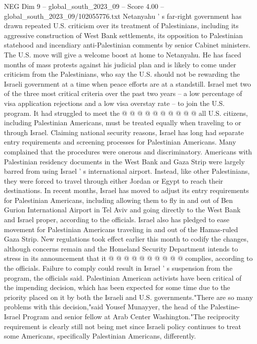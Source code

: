 \begin{textsample}{NEG Dim 9 – global\_south\_2023\_09 – Score 4.00 – global\_south\_2023\_09/102055776.txt}
Netanyahu ' s far-right government has drawn repeated U.S. criticism over its treatment of Palestinians, including its aggressive construction of West Bank settlements, its opposition to Palestinian statehood and incendiary anti-Palestinian comments by senior Cabinet ministers.
The U.S. move will give a welcome boost at home to Netanyahu.
He has faced months of mass protests against his judicial plan and is likely to come under criticism from the Palestinians, who say the U.S. should not be rewarding the Israeli government at a time when peace efforts are at a standstill.
Israel met two of the three most critical criteria over the past two years -- a low percentage of visa application rejections and a low visa overstay rate -- to join the U.S. program.
It had struggled to meet the @ @ @ @ @ @ @ @ @ @ all U.S. citizens, including Palestinian Americans, must be treated equally when traveling to or through Israel.
Claiming national security reasons, Israel has long had separate entry requirements and screening processes for Palestinian Americans.
Many complained that the procedures were onerous and discriminatory.
Americans with Palestinian residency documents in the West Bank and Gaza Strip were largely barred from using Israel ' s international airport.
Instead, like other Palestinians, they were forced to travel through either Jordan or Egypt to reach their destinations.
In recent months, Israel has moved to adjust its entry requirements for Palestinian Americans, including allowing them to fly in and out of Ben Gurion International Airport in Tel Aviv and going directly to the West Bank and Israel proper, according to the officials.
Israel also has pledged to ease movement for Palestinian Americans traveling in and out of the Hamas-ruled Gaza Strip.
New regulations took effect earlier this month to codify the changes, although concerns remain and the Homeland Security Department intends to stress in its announcement that it @ @ @ @ @ @ @ @ @ @ complies, according to the officials.
Failure to comply could result in Israel ' s suspension from the program, the officials said.
Palestinian American activists have been critical of the impending decision, which has been expected for some time due to the priority placed on it by both the Israeli and U.S. governments."There are so many problems with this decision,"said Yousef Munayyer, the head of the Palestine-Israel Program and senior fellow at Arab Center Washington."The reciprocity requirement is clearly still not being met since Israeli policy continues to treat some Americans, specifically Palestinian Americans, differently.

\end{textsample}
